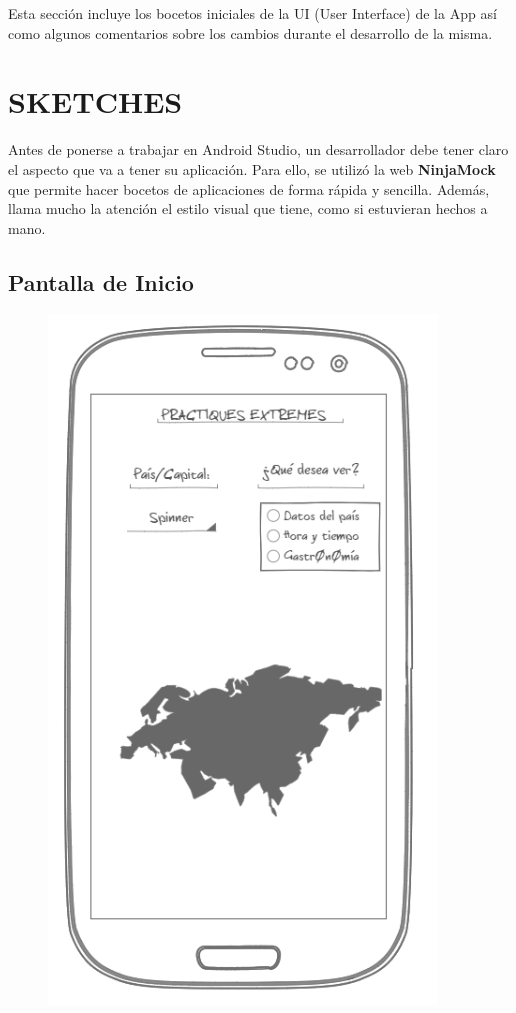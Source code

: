 \documentclass[letterpaper,twocolumn,openany,nodeprecatedcode,dvipsnames,nomultitoc]{dndbook}
\begin{document}
\par 
\begin{justify}

Esta sección incluye los bocetos iniciales de la UI (User Interface) de la App así como algunos comentarios sobre los cambios durante el desarrollo de la misma.


\section{SKETCHES}

\vspace{5pt}

Antes de ponerse a trabajar en Android Studio, un desarrollador debe tener claro el aspecto que va a tener su aplicación. Para ello, se utilizó la web \textbf{NinjaMock} que permite hacer bocetos de aplicaciones de forma rápida y sencilla. Además, llama mucho la atención el estilo visual que tiene, como si estuvieran hechos a mano.

\subsection{Pantalla de Inicio}
\begin{figure}[h]
\centering
\includegraphics[scale = 0.2]{Manual/img/Pantalla Main.png}
\end{figure}


\end{justify}
\end{document}

